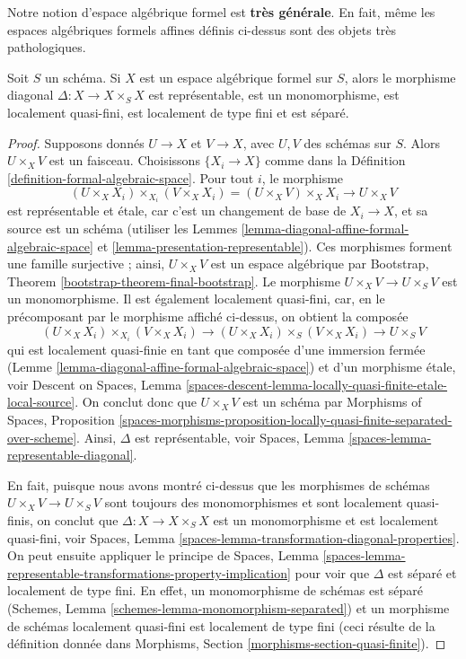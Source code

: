 \medskip\noindent
Notre notion d'espace algébrique formel est {\bf très générale}.
En fait, même les espaces algébriques formels affines définis ci-dessus
sont des objets très pathologiques.

\begin{lemma}
\label{lemma-diagonal-formal-algebraic-space}
Soit $S$ un schéma. Si $X$ est un espace algébrique formel sur
$S$, alors le morphisme diagonal $\Delta : X \to X \times_S X$
est représentable, est un monomorphisme, est localement quasi-fini,
est localement de type fini et est séparé.
\end{lemma}

\begin{proof}
Supposons donnés $U \to X$ et $V \to X$, avec $U, V$ des schémas sur $S$.
Alors $U \times_X V$ est un faisceau. Choisissons $\{X_i \to X\}$ comme dans la
Définition \ref{definition-formal-algebraic-space}.
Pour tout $i$, le morphisme
$$
(U \times_X X_i) \times_{X_i} (V \times_X X_i)
= (U \times_X V) \times_X X_i \to U \times_X V
$$
est représentable et étale, car c'est un changement de base de $X_i \to X$,
et sa source est un schéma (utiliser les
Lemmes \ref{lemma-diagonal-affine-formal-algebraic-space} et
\ref{lemma-presentation-representable}). Ces morphismes forment une famille surjective ;
ainsi, $U \times_X V$ est un espace algébrique par
Bootstrap, Theorem \ref{bootstrap-theorem-final-bootstrap}.
Le morphisme $U \times_X V \to U \times_S V$ est un monomorphisme.
Il est également localement quasi-fini, car, en le précomposant par
le morphisme affiché ci-dessus, on obtient la composée
$$
(U \times_X X_i) \times_{X_i} (V \times_X X_i)
\to (U \times_X X_i) \times_S (V \times_X X_i)
\to U \times_S V
$$
qui est localement quasi-finie en tant que composée d'une immersion
fermée (Lemme \ref{lemma-diagonal-affine-formal-algebraic-space})
et d'un morphisme étale, voir
Descent on Spaces, Lemma
\ref{spaces-descent-lemma-locally-quasi-finite-etale-local-source}.
On conclut donc que $U \times_X V$ est un schéma par
Morphisms of Spaces, Proposition
\ref{spaces-morphisms-proposition-locally-quasi-finite-separated-over-scheme}.
Ainsi, $\Delta$ est représentable, voir
Spaces, Lemma \ref{spaces-lemma-representable-diagonal}.

\medskip\noindent
En fait, puisque nous avons montré ci-dessus que les morphismes de schémas
$U \times_X V \to U \times_S V$ sont toujours des monomorphismes et sont
localement quasi-finis, on conclut que $\Delta : X \to X \times_S X$
est un monomorphisme et est localement quasi-fini, voir
Spaces, Lemma \ref{spaces-lemma-transformation-diagonal-properties}.
On peut ensuite appliquer le principe de
Spaces, Lemma
\ref{spaces-lemma-representable-transformations-property-implication}
pour voir que $\Delta$ est séparé et localement de type fini.
En effet, un monomorphisme de schémas est séparé
(Schemes, Lemma \ref{schemes-lemma-monomorphism-separated})
et un morphisme de schémas localement quasi-fini est
localement de type fini
(ceci résulte de la définition donnée dans
Morphisms, Section \ref{morphisms-section-quasi-finite}).
\end{proof}

